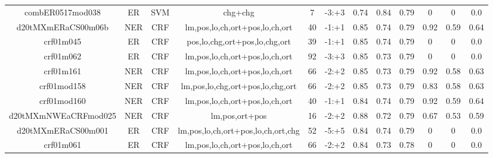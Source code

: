 \documentclass[a4paper]{article}
\begin{document}
\begin{landscape}
\begin{center}
\begin{tabular}{ |c|c|c|c|c|c|c|c|c|c|c|c|}
 	

 
 	
 	\small{ combER0517mod038 } & ER & SVM & chg+chg  &  7 &  -3:+3  &  0.74 & 0.84 & 0.79  &  0 & 0 & 0.0 \\
 	

 
 	
 	\small{ d20tMXmERaCS00m06b } & NER & CRF & lm,pos,lo,ch,ort+pos,lo,ch,ort  &  40 &  -1:+1  &  0.85 & 0.74 & 0.79  &  0.92 & 0.59 & 0.64 \\
 	

 
 	
 	\small{ crf01m045 } & ER & CRF & pos,lo,chg,ort+pos,lo,chg,ort  &  39 &  -1:+1  &  0.85 & 0.74 & 0.79  &  0 & 0 & 0.0 \\
 	

 
 	
 	\small{ crf01m062 } & ER & CRF & lm,pos,lo,ch,ort+pos,lo,ch,ort  &  92 &  -3:+3  &  0.85 & 0.73 & 0.79  &  0 & 0 & 0.0 \\
 	

 
 	
 	\small{ crf01m161 } & NER & CRF & lm,pos,lo,ch,ort+pos,lo,ch,ort  &  66 &  -2:+2  &  0.85 & 0.73 & 0.79  &  0.92 & 0.58 & 0.63 \\
 	

 
 	
 	\small{ crf01mod158 } & NER & CRF & lm,pos,lo,chg,ort+pos,lo,chg,ort  &  66 &  -2:+2  &  0.85 & 0.73 & 0.79  &  0.83 & 0.58 & 0.63 \\
 	

 
 	
 	\small{ crf01mod160 } & NER & CRF & lm,pos,lo,ch,ort+pos,lo,ch,ort  &  40 &  -1:+1  &  0.84 & 0.74 & 0.79  &  0.92 & 0.59 & 0.64 \\
 	

 
 	
 	\small{ d20tMXmNWEaCRFmod025 } & NER & CRF & lm,pos,ort+pos  &  16 &  -2:+2  &  0.88 & 0.72 & 0.79  &  0.67 & 0.53 & 0.59 \\
 	

 
 	
 	\small{ d20tMXmERaCS00m001 } & ER & CRF & lm,pos,lo,ch,ort+pos,lo,ch,ort,chg  &  52 &  -5:+5  &  0.84 & 0.74 & 0.79  &  0 & 0 & 0.0 \\
 	

 
 	
 	\small{ crf01m061 } & ER & CRF & lm,pos,lo,ch,ort+pos,lo,ch,ort  &  66 &  -2:+2  &  0.84 & 0.73 & 0.78  &  0 & 0 & 0.0 \\
 	


\end{tabular}
\end{center}
\end{landscape}
\end{document}
